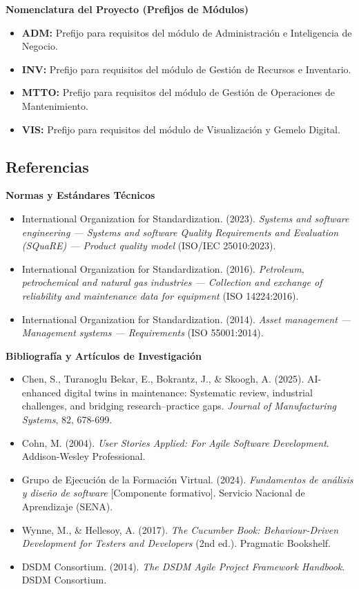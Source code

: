 \textbf{Nomenclatura del Proyecto (Prefijos de Módulos)}
\begin{itemize}
    \item \textbf{ADM:} Prefijo para requisitos del módulo de Administración e Inteligencia de Negocio.
    \item \textbf{INV:} Prefijo para requisitos del módulo de Gestión de Recursos e Inventario.
    \item \textbf{MTTO:} Prefijo para requisitos del módulo de Gestión de Operaciones de Mantenimiento.
    \item \textbf{VIS:} Prefijo para requisitos del módulo de Visualización y Gemelo Digital.
\end{itemize}

\subsection{Referencias}
\textbf{Normas y Estándares Técnicos}
\begin{itemize}
    \item International Organization for Standardization. (2023). \textit{Systems and software engineering — Systems and software Quality Requirements and Evaluation (SQuaRE) — Product quality model} (ISO/IEC 25010:2023).
    \item International Organization for Standardization. (2016). \textit{Petroleum, petrochemical and natural gas industries — Collection and exchange of reliability and maintenance data for equipment} (ISO 14224:2016).
    \item International Organization for Standardization. (2014). \textit{Asset management — Management systems — Requirements} (ISO 55001:2014).
\end{itemize}

\textbf{Bibliografía y Artículos de Investigación}
\begin{itemize}
    \item Chen, S., Turanoglu Bekar, E., Bokrantz, J., \& Skoogh, A. (2025). AI-enhanced digital twins in maintenance: Systematic review, industrial challenges, and bridging research–practice gaps. \textit{Journal of Manufacturing Systems}, 82, 678-699.
    \item Cohn, M. (2004). \textit{User Stories Applied: For Agile Software Development}. Addison-Wesley Professional.
    \item Grupo de Ejecución de la Formación Virtual. (2024). \textit{Fundamentos de análisis y diseño de software} [Componente formativo]. Servicio Nacional de Aprendizaje (SENA).
    \item Wynne, M., \& Hellesoy, A. (2017). \textit{The Cucumber Book: Behaviour-Driven Development for Testers and Developers} (2nd ed.). Pragmatic Bookshelf.
    \item DSDM Consortium. (2014). \textit{The DSDM Agile Project Framework Handbook}. DSDM Consortium.
\end{itemize}

